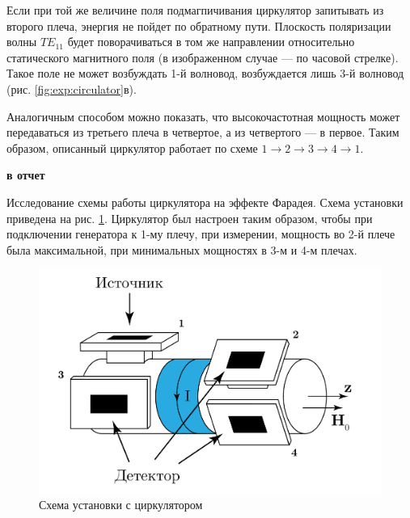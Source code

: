 Если при той же величине поля подмагпичивания циркулятор запитывать из второго плеча, энергия не пойдет по обратному
пути. Плоскость поляризации волны $TE_{11}$ будет поворачиваться в том же направлении относительно статического магнитного
поля (в изображенном случае — по часовой стрелке). Такое поле не может возбуждать 1-й волновод, возбуждается лишь 3-й
волновод (рис. \ref{fig:exp:circulator}в).

Аналогичным способом можно показать, что высокочастотная мощность может передаваться из третьего плеча в четвертое, а из
четвертого — в первое. Таким образом, описанный циркулятор работает по схеме
 $1 \rightarrow 2 \rightarrow 3 \rightarrow 4 \rightarrow 1.$

\textbf{в отчет} 

Исследование схемы работы циркулятора на эффекте Фарадея. Схема установки приведена на рис. \ref{fig:exp:circulator2}.
Циркулятор был настроен таким образом, чтобы при подключении генератора к 1-му плечу, при измерении, мощность во 2-й
плече была максимальной, при минимальных мощностях в 3-м и 4-м плечах.

\begin{figure}[h!]
    \centering
    \includegraphics[width = 0.8\linewidth]{imgs/circulator2.pdf}
    \caption{Схема установки с циркулятором}
    \label{fig:exp:circulator2}
\end{figure}

